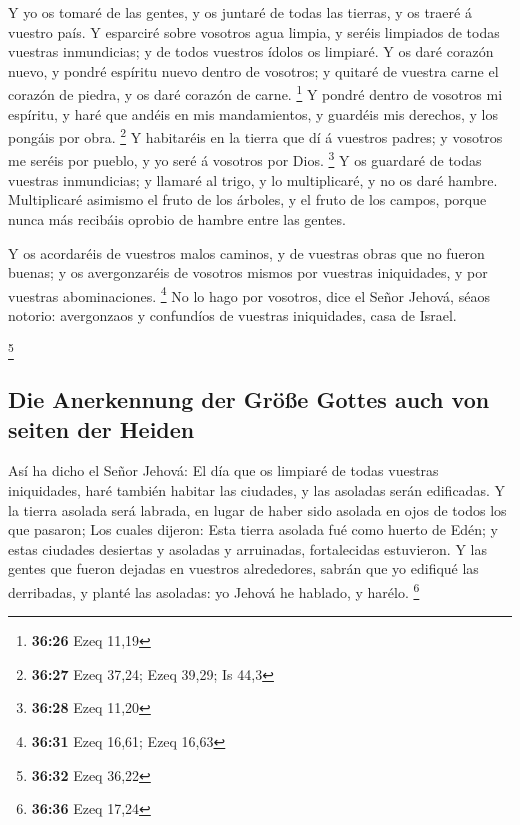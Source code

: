  Y yo os tomaré de las gentes, y os juntaré de todas las
tierras, y os traeré á vuestro país.  Y esparciré sobre
vosotros agua limpia, y seréis limpiados de todas vuestras inmundicias;
y de todos vuestros ídolos os limpiaré.  Y os daré corazón
nuevo, y pondré espíritu nuevo dentro de vosotros; y quitaré de vuestra
carne el corazón de piedra, y os daré corazón de carne. \footnote{\textbf{36:26}
  Ezeq 11,19}  Y pondré dentro de vosotros mi espíritu, y
haré que andéis en mis mandamientos, y guardéis mis derechos, y los
pongáis por obra. \footnote{\textbf{36:27} Ezeq 37,24; Ezeq 39,29; Is
  44,3}  Y habitaréis en la tierra que dí á vuestros
padres; y vosotros me seréis por pueblo, y yo seré á vosotros por Dios.
\footnote{\textbf{36:28} Ezeq 11,20}  Y os guardaré de
todas vuestras inmundicias; y llamaré al trigo, y lo multiplicaré, y no
os daré hambre.  Multiplicaré asimismo el fruto de los
árboles, y el fruto de los campos, porque nunca más recibáis oprobio de
hambre entre las gentes.

 Y os acordaréis de vuestros malos caminos, y de vuestras
obras que no fueron buenas; y os avergonzaréis de vosotros mismos por
vuestras iniquidades, y por vuestras abominaciones. \footnote{\textbf{36:31}
  Ezeq 16,61; Ezeq 16,63}  No lo hago por vosotros, dice el
Señor Jehová, séaos notorio: avergonzaos y confundíos de vuestras
iniquidades, casa de Israel.

\footnote{\textbf{36:32} Ezeq 36,22}

\hypertarget{die-anerkennung-der-gruxf6uxdfe-gottes-auch-von-seiten-der-heiden}{%
\subsection{Die Anerkennung der Größe Gottes auch von seiten der
Heiden}\label{die-anerkennung-der-gruxf6uxdfe-gottes-auch-von-seiten-der-heiden}}

 Así ha dicho el Señor Jehová: El día que os limpiaré de
todas vuestras iniquidades, haré también habitar las ciudades, y las
asoladas serán edificadas.  Y la tierra asolada será
labrada, en lugar de haber sido asolada en ojos de todos los que
pasaron;  Los cuales dijeron: Esta tierra asolada fué como
huerto de Edén; y estas ciudades desiertas y asoladas y arruinadas,
fortalecidas estuvieron.  Y las gentes que fueron dejadas
en vuestros alrededores, sabrán que yo edifiqué las derribadas, y planté
las asoladas: yo Jehová he hablado, y harélo. \footnote{\textbf{36:36}
  Ezeq 17,24}

